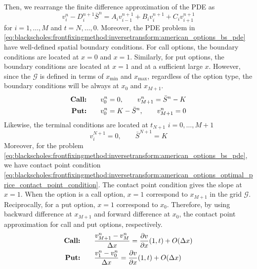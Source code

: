 Then, we rearrange the finite difference approximation of the PDE as 
\begin{equation}
  v^{n}_{i} - D^{n+1}_{i}\bar{S}^n = A_i v^{n+1}_{i-1} + B_{i}v^{n+1}_{i} + C_{i}v^{n+1}_{i+1}
  \label{eq:finitedifferencesschemes:explicit:pde_simplified}
\end{equation}
for $i = 1, \dots, M$ and $t = N, \dots, 0$. Moreover, the PDE problem in \eqref{eq:blackscholes:frontfixingmethod:inversetransform:american_options_bs_pde} have well-defined spatial boundary conditions. For call options, the boundary conditions are located at $x=0$ and $x=1$. Similarly, for put options, the boundary conditions are located at $x=1$ and at a sufficient large $x$. However, since the $\mathcal{G}$ is defined in terms of $x_\text{min}$ and $x_\text{max}$, regardless of the option type, the boundary conditions will be always at $x_0$ and $x_{M+1}$.
\begin{subequations}
  \label{eq:finitedifferencesschemes:explicit:boundary_conditions}
  \begin{align}
    \text{\textbf{Call:}} \qquad & v^{n}_{0} = 0, \qquad v^{n}_{M+1} = \bar{S}^{n} - K\\
    \text{\textbf{Put:}} \qquad & v^{n}_{0} = K - \bar{S}^{n}, \qquad v^{n}_{M+1} = 0
  \end{align}
\end{subequations}
Likewise, the terminal conditions are located at $t_{N+1}$ $i=0,\dots,M+1$
\begin{subequations}
  \label{eq:finitedifferencesschemes:explicit:terminal_conditions}
  \begin{equation}
    v^{N+1}_{i} = 0, \qquad \bar{S}^{N+1} = K
  \end{equation}
\end{subequations}
Moreover, for the problem \eqref{eq:blackscholes:frontfixingmethod:inversetransform:american_options_bs_pde}, we have contact point condition \eqref{eq:blackscholes:frontfixingmethod:inversetransform:american_options_optimal_price_contact_point_condition}. The contact point condition gives the slope at $x=1$. When the option is a call option, $x=1$ correspond to $x_{M+1}$ in the grid $\mathcal{G}$. Reciprocally, for a put option, $x=1$ correspond to $x_0$. Therefore, by using backward difference at $x_{M+1}$ and forward difference at $x_0$, the contact point approximation for call and put options, respectively.
\begin{align*}
  \text{\textbf{Call:}} \qquad & \dfrac{v^{n}_{M+1} - v^{n}_{M}}{\Delta{x}} = \dfrac{\partial{v}}{\partial{x}}(1, t) + O(\Delta{x}) \\
  \text{\textbf{Put:}} \qquad & \dfrac{v^{n}_{1} - v^{n}_{0}}{\Delta{x}} = \dfrac{\partial{v}}{\partial{x}}(1, t)+ O(\Delta{x}) 
\end{align*}
